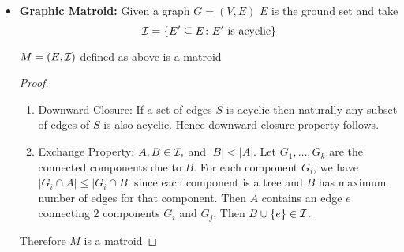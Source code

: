 \begin{itemize}[label=$\bullet$]
\begin{proof}
\begin{enumerate}[label=\bfseries\tiny\protect\circled{\small\arabic*}]
		 Now we take a look at the chain $\sL_{e_i}$. For brevity we will use $e$ instead of $e_i$. So in the chain $\sL_e=\{L_1,\dots, L_n\}$ such that  we have $$L_n\supseteq L_{n-1}\supseteq \cdots \supseteq L_2\supseteq L_1$$Then take $i\in[n]$ to be the largest index such that $|A\cap L_i|\leq |B\cap L_i|$. There will be such index because otherwise we will have $|A|\leq |B|$ which is not possible. Then take $e^*\in (A\cap L_{i+1})-(L_i\cup B)$. Such an $e^*$ will exist because $|A\cap L_{i+1}|>|A\cap L_{i+1}|\implies A\cap (L_{i+1}- L_{i}\neq \emptyset$ and also $A\cap (L_{i+1}- L_{i}\not\subseteq B\cap (L_{i+1}-L_i)$ because otherwise we will have $$|A\cap L_{i+1}|=|A\cap (L_{i+1}- L_{i}|+|A\cap L_{i+1}|\leq |B\cap (L_{i+1}-L_i)|+|B\cap L_i|=|B\cap L_{i+1}|$$which is not possible. Hence there exists $e^*$ such that $e^*\in (A\cap L_{i+1})-(L_i\cup B)$. Therefore take $B^*=B\cup \{e^*\}$. Then for all $j< i$ we have $B^*\cap L_j=B\cap L_j$ so we don't have a problem there. Now for all $j\geq i$ we have $|A\cap L_j|>|B\cap L_j|$. Hence now $|B^*\cap L_j|\leq |B\cap L_j|+1\leq |A\cap L_j|\leq k(L_j)$. Therefore we have $B^*\in\mcI$. Hence the exchange property follows.
	\end{enumerate}
Therefore $M$ is a matroid.
\end{proof}
\item \textbf{Graphic Matroid:} Given a graph $G=(V,E)$ $E$ is the ground set and take $$\mathcal{I}=\{E'\subseteq E\colon E'\text{ is acyclic} \}$$
\begin{lemma}{}{}
	$M=(E,\mathcal{I})$ defined as above is a matroid
\end{lemma}
\begin{proof}
	\begin{enumerate}[label=\bfseries\tiny\protect\circled{\small\arabic*}]
		\item Downward Closure: If a set of edges $S$ is acyclic then naturally any subset of edges of $S$ is also acyclic. Hence downward closure property follows.
		\item Exchange Property: $A,B\in\mathcal{I},$ and $ |B|<|A|$. Let $G_1,\dots, G_k$ are the connected components due to $B$. For each component $G_i$, we have $|G_i\cap A|\leq |G_i\cap B|$ since each component is a tree and $B$ has maximum number of edges for that component. Then $A$ contains an edge $e$ connecting $2$ components $G_i$ and $G_j$. Then $B\cup \{e\}\in \mathcal{I}$. 
	\end{enumerate}Therefore $M$ is a matroid
\end{proof}


\end{itemize}
